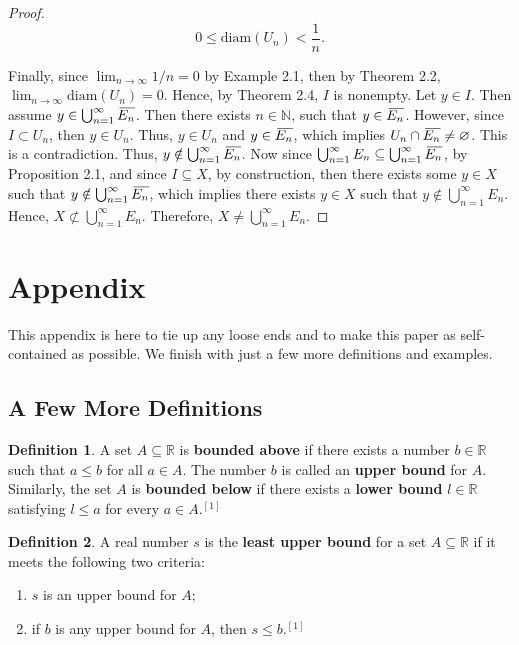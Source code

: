\documentclass{article}
\theoremstyle{definition}
\newtheorem{definition}{Definition}[section]
\theoremstyle{remark}
\newcommand{\closure}[2][3]{%
  {}\mkern#1mu\overline{\mkern-#1mu#2}}
\theoremstyle{definition}
\begin{document}
\begin{proof}
        \begin{equation*}
            0\leq\text{diam}(U_n)<\frac{1}{n}.
        \end{equation*}
    
    Finally, since $\lim_{n\rightarrow\infty}1/n=0$ by Example 2.1, then by Theorem 2.2, $\lim_{n\rightarrow\infty}\text{diam}(U_n)=0$. Hence, by Theorem 2.4, $I$ is nonempty. Let $y\in I$. Then assume $y\in\bigcup_{n=1}^{\infty}\closure{E_n}$. Then there exists $n\in\mathbb{N}$, such that $y\in\closure{E_n}$. However, since $I\subset U_n$, then $y\in U_n$. Thus, $y\in U_n$ and $y\in\closure{E_n}$, which implies $U_n\cap\closure{E_n}\neq\varnothing$. This is a contradiction. Thus, $y\notin\bigcup_{n=1}^{\infty}\closure{E_n}$. Now since $\bigcup_{n=1}^{\infty}E_n\subseteq\bigcup_{n=1}^{\infty}\closure{E_n}$, by Proposition 2.1, and since $I\subseteq X$, by construction, then there exists some $y\in X$ such that $y\notin\bigcup_{n=1}^{\infty}\closure{E_n}$, which implies there exists $y\in X$ such that $y\notin\bigcup_{n=1}^{\infty}E_n$. Hence, $X\not\subset\bigcup_{n=1}^{\infty}E_n$. Therefore, $X\neq\bigcup_{n=1}^{\infty}E_n$.
\end{proof}

\newpage

\section{Appendix}

This appendix is here to tie up any loose ends and to make this paper as self-contained as possible. We finish with just a few more definitions and examples.

\subsection{A Few More Definitions}

\begin{definition}
    A set $A\subseteq\mathbb{R}$ is \textbf{bounded above} if there exists a number $b\in\mathbb{R}$ such that $a\leq b$ for all $a\in A$. The number $b$ is called an \textbf{upper bound} for $A$. Similarly, the set $A$ is \textbf{bounded below} if there exists a \textbf{lower bound} $l\in\mathbb{R}$ satisfying $l\leq a$ for every $a\in A$.$^{[1]}$
\end{definition}

\begin{definition}
    A real number $s$ is the \textbf{least upper bound} for a set $A\subseteq\mathbb{R}$ if it meets the following two criteria:
    
    \begin{enumerate}[label=(\roman*)]
        \item $s$ is an upper bound for $A$;
        \item if $b$ is any upper bound for $A$, then $s\leq b$.$^{[1]}$
    \end{enumerate}
\end{definition}
\end{document}

